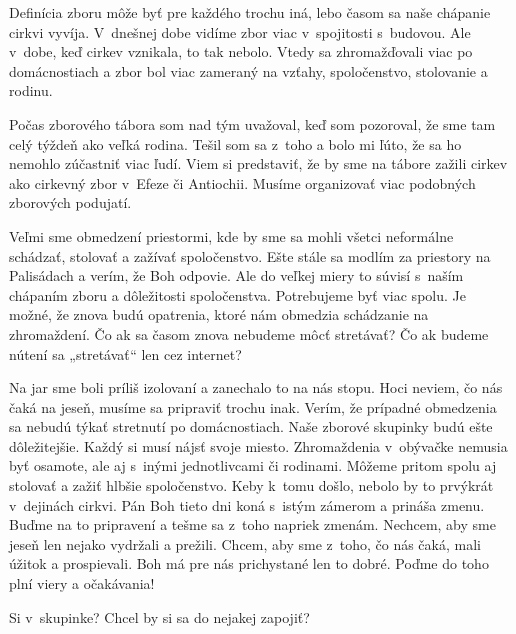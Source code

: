 


Definícia zboru môže byť pre každého trochu iná, lebo časom sa naše chápanie cirkvi vyvíja. V~dnešnej dobe vidíme zbor viac v~spojitosti s~budovou. Ale v~dobe, keď cirkev vznikala, to tak nebolo. Vtedy sa zhromažďovali viac po domácnostiach a zbor bol viac zameraný na vzťahy, spoločenstvo, stolovanie a rodinu.

Počas zborového tábora som nad tým uvažoval, keď som pozoroval, že sme tam celý týždeň ako veľká rodina. Tešil som sa z~toho a bolo mi ľúto, že sa ho nemohlo zúčastniť viac ľudí. Viem si predstaviť, že by sme na tábore zažili cirkev ako cirkevný zbor v~Efeze či Antiochii. Musíme organizovať viac podobných zborových podujatí.

Veľmi sme obmedzení priestormi, kde by sme sa mohli všetci neformálne schádzať, stolovať a zažívať spoločenstvo. Ešte stále sa modlím za priestory na Palisádach a verím, že Boh odpovie. Ale do veľkej miery to súvisí s~naším chápaním zboru a dôležitosti spoločenstva. Potrebujeme byť viac spolu. Je možné, že znova budú opatrenia, ktoré nám obmedzia schádzanie na zhromaždení. Čo ak sa časom znova nebudeme môcť stretávať? Čo ak budeme nútení sa „stretávať“ len cez internet?

Na jar sme boli príliš izolovaní a zanechalo to na nás stopu. Hoci neviem, čo nás čaká na jeseň, musíme sa pripraviť trochu inak. Verím, že prípadné obmedzenia sa nebudú týkať stretnutí po domácnostiach. Naše zborové skupinky budú ešte dôležitejšie. Každý si musí nájsť svoje miesto. Zhromaždenia v~obývačke nemusia byť osamote, ale aj s~inými jednotlivcami či rodinami. Môžeme pritom spolu aj stolovať a zažiť hlbšie spoločenstvo. Keby k~tomu došlo, nebolo by to prvýkrát v~dejinách cirkvi. Pán Boh tieto dni koná s~istým zámerom a prináša zmenu. Buďme na to pripravení a tešme sa z~toho napriek zmenám. Nechcem, aby sme jeseň len nejako vydržali a prežili. Chcem, aby sme z~toho, čo nás čaká, mali úžitok a prospievali. Boh má pre nás prichystané len to dobré. Poďme do toho plní viery a očakávania!



Si v~skupinke? Chcel by si sa do nejakej zapojiť?

